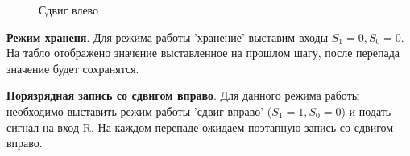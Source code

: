 \begin{figure}[H]
    \centering
    \hspace{40mm}
    \caption{Сдвиг влево}
\end{figure}

\textbf{Режим храненя}. Для режима работы 'хранение' выставим входы $S_1=0,S_0=0$. На табло отображено
значение выставленное на прошлом шагу, после перепада значение будет сохранятся.

\newpage

\textbf{Порязрядная запись со сдвигом вправо}. Для данного режима работы необходимо выставить режим работы
'сдвиг вправо' ($S_1=1,S_0=0$) и подать сигнал на вход R. На каждом перепаде ожидаем поэтапную запись со сдвигом вправо.

